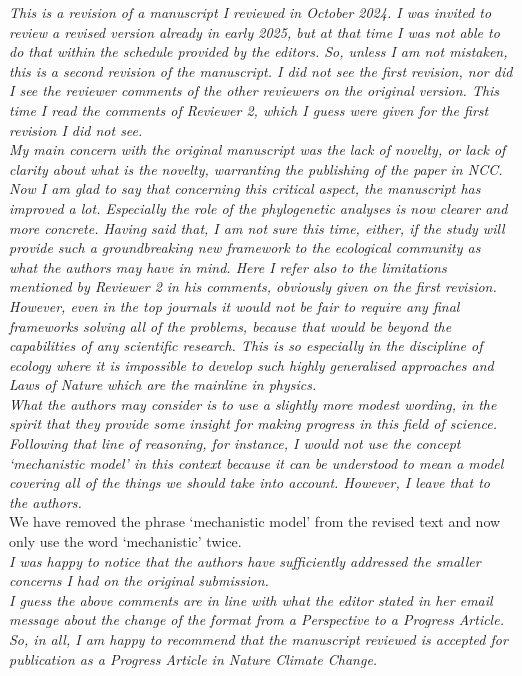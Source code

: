 \documentclass[11pt]{article}
\begin{document}
\emph{This is a revision of a manuscript I reviewed in October 2024. I was invited to review a revised version already in early 2025, but at that time I was not able to do that within the schedule provided by the editors. So, unless I am not mistaken, this is a second revision of the manuscript. I did not see the first revision, nor did I see the reviewer comments of the other reviewers on the original version. This time I read the comments of Reviewer 2, which I guess were given for the first revision I did not see.\\
My main concern with the original manuscript was the lack of novelty, or lack of clarity about what is the novelty, warranting the publishing of the paper in NCC. Now I am glad to say that concerning this critical aspect, the manuscript has improved a lot. Especially the role of the phylogenetic analyses is now clearer and more concrete. Having said that, I am not sure this time, either, if the study will provide such a groundbreaking new framework to the ecological community as what the authors may have in mind. Here I refer also to the limitations mentioned by Reviewer 2 in his comments, obviously given on the first revision. However, even in the top journals it would not be fair to require any final frameworks solving all of the problems, because that would be beyond the capabilities of any scientific research. This is so especially in the discipline of ecology where it is impossible to develop such highly generalised approaches and Laws of Nature which are the mainline in physics.\\
What the authors may consider is to use a slightly more modest wording, in the spirit that they provide some insight for making progress in this field of science. Following that line of reasoning, for instance, I would not use the concept ‘mechanistic model’ in this context because it can be understood to mean a model covering all of the things we should take into account. However, I leave that to the authors.}\\

We have removed the phrase `mechanistic model' from the revised text and now only use the word `mechanistic' twice. \\


\emph{I was happy to notice that the authors have sufficiently addressed the smaller concerns I had on the original submission.\\
I guess the above comments are in line with what the editor stated in her email message about the change of the format from a Perspective to a Progress Article. So, in all, I am happy to recommend that the manuscript reviewed is accepted for publication as a Progress Article in Nature Climate Change.}\\



\end{document}
